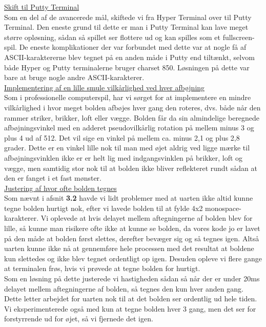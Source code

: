 \underline{Skift til Putty Terminal}\\

Som en del af de avancerede mål, skiftede vi fra Hyper Terminal over til Putty Terminal. Den eneste grund til dette er man i Putty Terminal kan lave meget større opløsning, sådan så spillet ser flottere ud og kan spilles som et fullscreen-spil. De eneste komplikationer der var forbundet med dette var at nogle få af ASCII-karaktererne blev tegnet på en anden måde i Putty end tiltænkt, selvom både Hyper og Putty terminalerne bruger charset 850. Løsningen på dette var bare at bruge nogle andre ASCII-karakterer.\\

\underline{Implementering af en lille smule vilkårlighed ved hver afbøjning}\\

Som i professionelle computerspil, har vi sørget for at implementere en mindre vilkårlighed i hvor meget bolden afbøjes hver gang den roteres, dvs. både når den rammer striker, brikker, loft eller vægge. Bolden får da sin almindelige beregnede afbøjningsvinkel med en adderet pseudovilkårlig rotation på mellem minus 3 og plus 4 ud af 512. Det vil sige en vinkel på mellem ca. minus 2,1 og plus 2,8 grader. Dette er en vinkel lille nok til man med øjet aldrig ved ligge mærke til afbøjningsvinklen ikke er er helt lig med indgangsvinklen på brikker, loft og vægge, men samtidig stor nok til at bolden ikke bliver reflekteret rundt sådan at den er fanget i et fast mønster.\\

\underline{Justering af hvor ofte bolden tegnes}\\

Som nævnt i afsnit \textbf{3.2} havde vi lidt problemer med at uarten ikke altid kunne tegne bolden hurtigt nok, efter vi lavede bolden til at fylde 4x2 monospace-karakterer. Vi oplevede at hvis delayet mellem aftegningerne af bolden blev for lille, så kunne man risikere ofte ikke at kunne se bolden, da vores kode jo er lavet på den måde at bolden først slettes, derefter bevæger sig og så tegnes igen. Altså uarten kunne ikke nå at gennemføre hele processen med det resultat at boldene kun slettedes og ikke blev tegnet ordentligt op igen. Desuden opleve vi flere gange at terminalen frøs, hvis vi prøvede at tegne bolden for hurtigt.\\
Som en løsning på dette justerede vi hastigheden sådan så når der er under 20ms delayet mellem aftegningerne af bolden, så tegnes den kun hver anden gang. Dette letter arbejdet for uarten nok til at det bolden ser ordentlig ud hele tiden. Vi eksperimenterede også med kun at tegne bolden hver 3 gang, men det ser for forstyrrende ud for øjet, så vi fjernede det igen.\\


